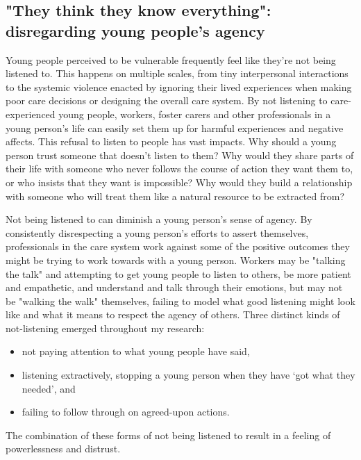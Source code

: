 \subsection{"They think they know everything": disregarding young people's agency}
Young people perceived to be vulnerable frequently feel like they're not being listened to. This happens on multiple scales, from tiny interpersonal interactions to the systemic violence enacted by ignoring their lived experiences when making poor care decisions or designing the overall care system. By not listening to care-experienced young people, workers, foster carers and other professionals in a young person's life can easily set them up for harmful experiences and negative affects. This refusal to listen to people has vast impacts. Why should a young person trust someone that doesn't listen to them? Why would they share parts of their life with someone who never follows the course of action they want them to, or who insists that they want is impossible? Why would they build a relationship with someone who will treat them like a natural resource to be extracted from?

Not being listened to can diminish a young person's sense of agency. By consistently disrespecting a young person's efforts to assert themselves, professionals in the care system work against some of the positive outcomes they might be trying to work towards with a young person. Workers may be "talking the talk" and attempting to get young people to listen to others, be more patient and empathetic, and understand and talk through their emotions, but may not be "walking the walk" themselves, failing to model what good listening might look like and what it means to respect the agency of others. Three distinct kinds of not-listening emerged throughout my research:

\begin{itemize}
    \item not paying attention to what young people have said,
    \item listening extractively, stopping a young person when they have `got what they needed', and
    \item failing to follow through on agreed-upon actions.
\end{itemize}
The combination of these forms of not being listened to result in a feeling of powerlessness and distrust.

